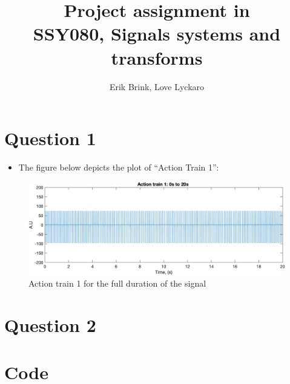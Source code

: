 \documentclass[a4paper, 12pt]{article}
\title{Project assignment in\\
       SSY080, Signals systems and transforms}
\author{Erik Brink, Love Lyckaro}
\begin{document}
\maketitle
{}
\newpage
{}

\section*{Question 1}
  \begin{itemize}
    \item The figure below depicts the plot of ``Action Train 1'':
  \end{itemize}
  \begin{figure}[H]
    \centering
    \includegraphics[width= \textwidth]{at1_0to20.png}
    \caption{Action train 1 for the full duration of the signal}
  \end{figure}
\newpage
\section*{Question 2}

\newpage
{}
\section{Code}
    
\end{document}
